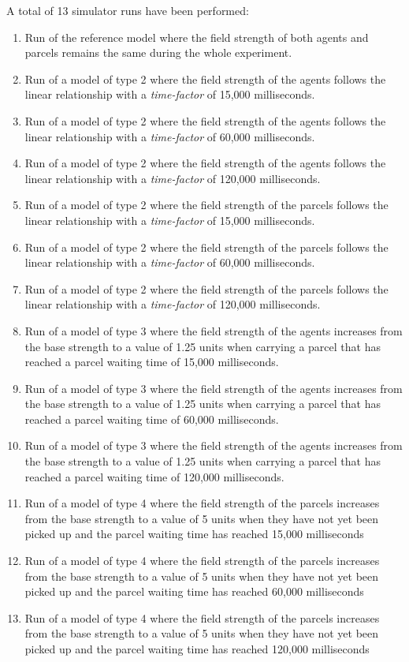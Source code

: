 A total of 13 simulator runs have been performed:
\begin{enumerate}
    \item Run of the reference model where the field strength of both agents and parcels remains the same during the whole experiment.
    \item Run of a model of type 2 where the field strength of the agents follows the linear relationship with a \emph{time-factor} of 15,000 milliseconds.
    \item Run of a model of type 2 where the field strength of the agents follows the linear relationship with a \emph{time-factor} of 60,000 milliseconds.
    \item Run of a model of type 2 where the field strength of the agents follows the linear relationship with a \emph{time-factor} of 120,000 milliseconds.
    \item Run of a model of type 2 where the field strength of the parcels follows the linear relationship with a \emph{time-factor} of 15,000 milliseconds.
    \item Run of a model of type 2 where the field strength of the parcels follows the linear relationship with a \emph{time-factor} of 60,000 milliseconds.
    \item Run of a model of type 2 where the field strength of the parcels follows the linear relationship with a \emph{time-factor} of 120,000 milliseconds.
    \item Run of a model of type 3 where the field strength of the agents increases from the base strength to a value of 1.25 units when carrying a parcel that has reached a parcel waiting time of 15,000 milliseconds.
    \item Run of a model of type 3 where the field strength of the agents increases from the base strength to a value of 1.25 units when carrying a parcel that has reached a parcel waiting time of 60,000 milliseconds.
    \item Run of a model of type 3 where the field strength of the agents increases from the base strength to a value of 1.25 units when carrying a parcel that has reached a parcel waiting time of 120,000 milliseconds.
    \item Run of a model of type 4 where the field strength of the parcels increases from the base strength to a value of 5 units when they have not yet been picked up and the parcel waiting time has reached 15,000 milliseconds
    \item Run of a model of type 4 where the field strength of the parcels increases from the base strength to a value of 5 units when they have not yet been picked up and the parcel waiting time has reached 60,000 milliseconds
    \item Run of a model of type 4 where the field strength of the parcels increases from the base strength to a value of 5 units when they have not yet been picked up and the parcel waiting time has reached 120,000 milliseconds
\end{enumerate}

